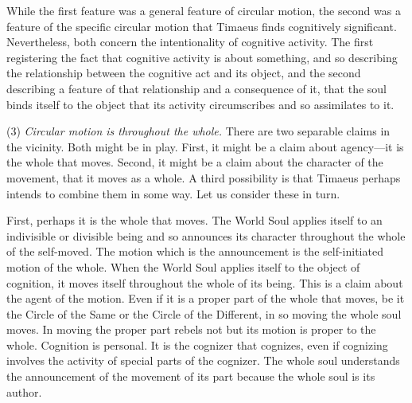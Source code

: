 While the first feature was a general feature of circular motion, the second was a feature of the specific circular motion that Timaeus finds cognitively significant. Nevertheless, both concern the intentionality of cognitive activity. The first registering the fact that cognitive activity is about something, and so describing the relationship between the cognitive act and its object, and the second describing a feature of that relationship and a consequence of it, that the soul binds itself to the object that its activity circumscribes and so assimilates to it.

(3) \emph{Circular motion is throughout the whole.} There are two separable claims in the vicinity. Both might be in play. First, it might be a claim about agency---it is the whole that moves. Second, it might be a claim about the character of the movement, that it moves as a whole. A third possibility is that Timaeus perhaps intends to combine them in some way. Let us consider these in turn. 

First, perhaps it is the whole that moves. The World Soul applies itself to an indivisible or divisible being and so announces its character throughout the whole of the self-moved. The motion which is the announcement is the self-initiated motion of the whole. When the World Soul applies itself to the object of cognition, it moves itself throughout the whole of its being. This is a claim about the agent of the motion. Even if it is a proper part of the whole that moves, be it the Circle of the Same or the Circle of the Different, in so moving the whole soul moves. In moving the proper part rebels not but its motion is proper to the whole. Cognition is personal. It is the cognizer that cognizes, even if cognizing involves the activity of special parts of the cognizer. The whole soul understands the announcement of the movement of its part because the whole soul is its author.

